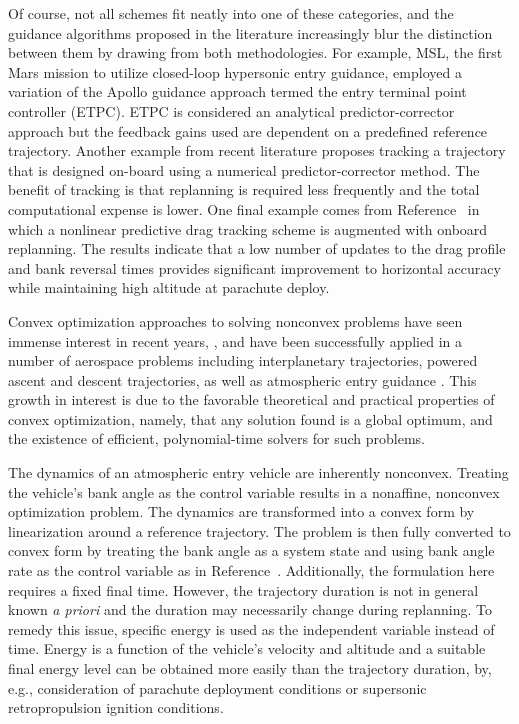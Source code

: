 \documentclass[letterpaper, preprint, paper,11pt]{AAS}	%
\begin{document}
	Of course, not all schemes fit neatly into one of these categories, and the guidance algorithms proposed in the literature increasingly blur the distinction between them by drawing from both methodologies. 
	For example, MSL, the first Mars mission to utilize closed-loop hypersonic entry guidance, employed a variation of the Apollo guidance approach termed the entry terminal point controller (ETPC)\cite{ETPC}. ETPC is considered an analytical predictor-corrector approach but the feedback gains used are dependent on a predefined reference trajectory. 
	Another example from recent literature proposes tracking a trajectory that is designed on-board using a numerical predictor-corrector method\cite{PredictorCorrectorTracking, PredictorCorrectorTracking2}. The benefit of tracking is that replanning is required less frequently and the total computational expense is lower. 
	One final example comes from Reference~ in which a nonlinear predictive drag tracking scheme is augmented with onboard replanning. The results indicate that a low number of updates to the drag profile and bank reversal times provides significant improvement to horizontal accuracy while maintaining high altitude at parachute deploy. 
	
	Convex optimization approaches to solving nonconvex problems have seen immense interest in recent years, \cite{SeqConProg,SuccConvex1,SuccConvex2}, and have been successfully applied in a number of aerospace problems including interplanetary trajectories\cite{wang2018convex}, powered ascent \cite{PS_ConvexAscent} and descent \cite{ConvexDescent} trajectories, as well as atmospheric entry guidance \cite{WangConvexTraj,sagliano2018optimal}. This growth in interest is due to the favorable theoretical and practical properties of convex optimization, namely, that any solution found is a global optimum, and the existence of efficient, polynomial-time solvers for such problems. 
	
	The dynamics of an atmospheric entry vehicle are inherently nonconvex. Treating the vehicle's bank angle as the control variable results in a nonaffine, nonconvex optimization problem. The dynamics are transformed into a convex form by linearization around a reference trajectory. The problem is then fully converted to convex form by treating the bank angle as a system state and using bank angle rate as the control variable as in Reference~. Additionally, the formulation here requires a fixed final time. However, the trajectory duration is not in general known \textit{a priori} and the duration may necessarily change during replanning. To remedy this issue, specific energy is used as the independent variable instead of time. Energy is a function of the vehicle's velocity and altitude and a suitable final energy level can be obtained more easily than the trajectory duration, by, e.g., consideration of parachute deployment conditions or supersonic retropropulsion ignition conditions. 
	
\end{document}
